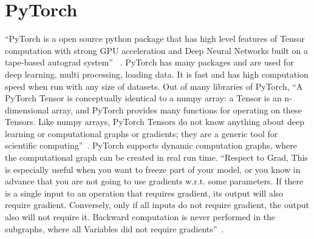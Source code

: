 \section{PyTorch}

“PyTorch is a open source python package that has high level features of 
Tensor computation with strong GPU acceleration and Deep 
Neural Networks built on a tape-based autograd system”
~\cite{hid-sp18-520-PyTorch}.
PyTorch has many packages and are used for deep learning, multi processing,
loading data. It is fast and has high computation speed when run with any size 
of datasets.
Out of many libraries of PyTorch, “A PyTorch Tensor is conceptually identical 
to a numpy array: a Tensor is an n-dimensional array, and PyTorch provides many
functions for operating on these Tensors. Like numpy arrays, PyTorch Tensors do 
not know anything about deep learning or computational graphs or gradients; they
are a generic tool for scientific computing”~\cite{hid-sp18-520-PyTorchtensor}.
PyTorch supports dynamic computation graphs, where the computational graph can 
be created in real run time.
“Respect to Grad, This is especially useful when you want to freeze part of your
model, or you know in advance that you are not going to use gradients w.r.t. 
some parameters. If there is a single input to an operation that requires 
gradient, its output will also require gradient. Conversely, only if all inputs 
do not require gradient, the output also will not require it. Backward 
computation is never performed in the subgraphs, where all Variables did not 
require gradients”~\cite{hid-sp18-520-PyTorchgrad}.
